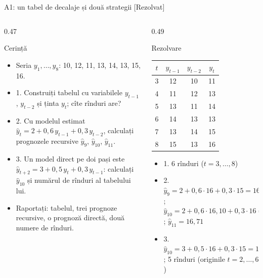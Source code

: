 \begin{frame}{A1: un tabel de decalaje și două strategii [Rezolvat]}
\itemsize{\scriptsize}
\begin{columns}[T]
\begin{column}{0.47\textwidth}
\begin{block}{Cerință}
\begin{itemize}
    \item Seria $y_1, \dots, y_8$: 10, 12, 11, 13, 14, 13, 15, 16.
    \item 1. Construiți tabelul cu variabilele $y_{t-1}$, $y_{t-2}$ și ținta $y_t$; cîte rînduri are?
    \item 2. Cu modelul estimat $\hat y_t = 2 + 0{,}6\,y_{t-1} + 0{,}3\,y_{t-2}$, calculați prognozele recursive $\hat y_9$, $\hat y_{10}$, $\hat y_{11}$.
    \item 3. Un model direct pe doi pași este $\hat y_{t+2} = 3 + 0{,}5\,y_t + 0{,}3\,y_{t-1}$: calculați $\hat y_{10}$ și numărul de rînduri al tabelului lui.
    \item Raportați: tabelul, trei prognoze recursive, o prognoză directă, două numere de rînduri.
\end{itemize}
\end{block}
\end{column}
\begin{column}{0.49\textwidth}
\begin{exampleblock}{Rezolvare}
\begin{center}
\scriptsize
\begin{tabular}{cccc}
\toprule
$t$ & $y_{t-1}$ & $y_{t-2}$ & $y_t$ \\
\midrule
3 & 12 & 10 & 11 \\
4 & 11 & 12 & 13 \\
5 & 13 & 11 & 14 \\
6 & 14 & 13 & 13 \\
7 & 13 & 14 & 15 \\
8 & 15 & 13 & 16 \\
\bottomrule
\end{tabular}
\end{center}
\begin{itemize}
    \item 1. 6 rînduri ($t = 3, \dots, 8$)
    \item 2. $\hat y_9 = 2 + 0{,}6 \cdot 16 + 0{,}3 \cdot 15 = 16{,}10$; $\hat y_{10} = 2 + 0{,}6 \cdot 16{,}10 + 0{,}3 \cdot 16 = 16{,}46$; $\hat y_{11} = 16{,}71$
    \item 3. $\hat y_{10} = 3 + 0{,}5 \cdot 16 + 0{,}3 \cdot 15 = 15{,}50$; 5 rînduri (originile $t = 2, \dots, 6$)
\end{itemize}
\end{exampleblock}
\end{column}
\end{columns}
\end{frame}


